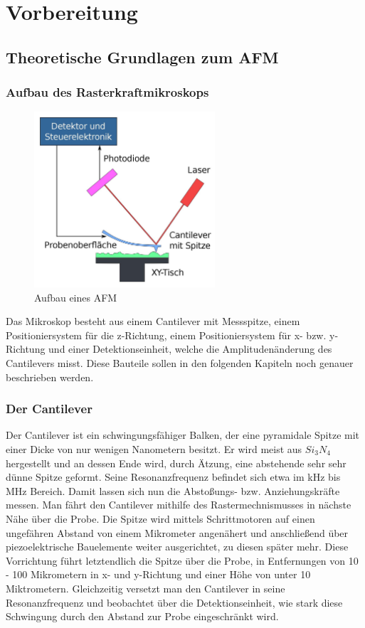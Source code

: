 \chapter{Vorbereitung}

\section{Theoretische Grundlagen zum AFM}
       
 \subsection{Aufbau des Rasterkraftmikroskops}
\begin{figure}[h!]
    \centering
    \includegraphics[width=0.6\textwidth]{Abb/afm.jpg}
    \caption{Aufbau eines AFM}
    \label{afm}
\end{figure}

Das Mikroskop besteht aus einem Cantilever mit Messspitze, einem Positioniersystem für die z-Richtung, einem Positioniersystem für x- bzw. y-Richtung und einer Detektionseinheit, welche die Amplitudenänderung des Cantilevers misst. 
Diese Bauteile sollen in den folgenden Kapiteln noch genauer beschrieben werden. 

 \subsection{Der Cantilever}
 
Der Cantilever ist ein schwingungsfähiger Balken, der eine pyramidale Spitze mit einer Dicke von nur wenigen Nanometern besitzt.
Er wird meist aus $Si_3N_4$ hergestellt und an dessen Ende wird, durch Ätzung, eine abstehende sehr sehr dünne Spitze geformt.
Seine Resonanzfrequenz befindet sich etwa im kHz bis MHz Bereich.
Damit lassen sich nun die Abstoßungs- bzw. Anziehungskräfte messen.
Man fährt den Cantilever mithilfe des Rastermechnismusses in nächste Nähe über die Probe.
Die Spitze wird mittels Schrittmotoren auf einen ungefähren Abstand von einem Mikrometer angenähert und anschließend über piezoelektrische Bauelemente weiter ausgerichtet, zu diesen später mehr.
Diese Vorrichtung führt letztendlich die Spitze über die Probe, in Entfernungen von 10 - 100 Mikrometern in x- und y-Richtung und einer Höhe von unter 10 Miktrometern.
Gleichzeitig versetzt man den Cantilever in seine Resonanzfrequenz und beobachtet über die Detektionseinheit, wie stark diese Schwingung durch den Abstand zur Probe eingeschränkt wird.

